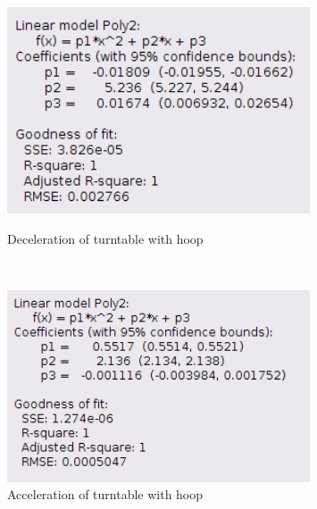     \begin{figure}[H]
    \centering
    \begin{minipage}{0.45\textwidth}
        \includegraphics[width=0.8\textwidth]{images/31info}
        \caption{Deceleration of turntable with hoop}\label{31info}
    \end{minipage}
    ~
    \begin{minipage}{0.45\textwidth}
        \includegraphics[width=0.8\textwidth]{images/32info}
        \caption{Acceleration of turntable with hoop}\label{32info}
    \end{minipage}
    \end{figure}


